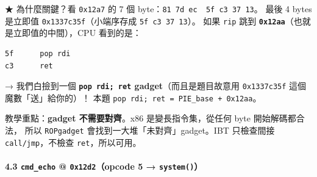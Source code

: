 \documentclass[10pt,a4paper]{article}
\renewenvironment{quote}{%
  \begin{mdframed}[linewidth=0pt,innerleftmargin=0pt,innerrightmargin=0pt,
    innerbottommargin=0pt,innertopmargin=0pt,skipabove=0.55em,skipbelow=0.55em,
    leftmargin=0.9em,rightmargin=0.4em,startcode={\color{quotebar}\vrule width 2.6pt},%
    endcode={}]%
  \itshape\color{black}%
}{%
  \end{mdframed}%
}
\begin{document}
★ 為什麼關鍵？看 \texttt{0x12a7} 的 7 個
byte：\texttt{81\ \allowbreak{}7d\ \allowbreak{}ec\ \allowbreak{}\textbar{}\allowbreak{}\ \allowbreak{}5f\ \allowbreak{}c3\ \allowbreak{}37\ \allowbreak{}13}。 最後 4 bytes
是立即值 \texttt{0x1337c35f}（小端序存成 \texttt{5f\ \allowbreak{}c3\ \allowbreak{}37\ \allowbreak{}13}）。
如果 \texttt{rip} 跳到
\textbf{\texttt{0x12aa}}（也就是立即值的中間），CPU 看到的是：

\begin{Verbatim}[breaklines=true,breakanywhere=true,breakautoindent=false,fontsize=\fontsize{7.0}{9.5}\selectfont]
5f      pop rdi
c3      ret
\end{Verbatim}

→ 我們白撿到一個 \textbf{\texttt{pop\ \allowbreak{}rdi;\ \allowbreak{}ret}
gadget}（而且是題目故意用 \texttt{0x1337c35f} 這個魔數「送」給你的）！
本題 \texttt{pop\ \allowbreak{}rdi;\ \allowbreak{}ret\ \allowbreak{}=\ \allowbreak{}PIE\_\allowbreak{}base\ \allowbreak{}+\ \allowbreak{}0x12aa}。

\begin{quote}
教學重點：\textbf{gadget 不需要對齊}。x86 是變長指令集，從任何 byte
開始解碼都合法， 所以 \texttt{ROPgadget}
會找到一大堆「未對齊」gadget。IBT 只檢查間接 \texttt{call/\allowbreak{}jmp}，不檢查
\texttt{ret}，所以可用。
\end{quote}

\paragraph{\texorpdfstring{4.3 \texttt{cmd\_\allowbreak{}echo} @
\texttt{0x12d2}（opcode 5 →
\texttt{system()}）}{4.3 cmd\_echo @ 0x12d2（opcode 5 → system()）}}\label{cmd_echo-0x12d2opcode-5-system}
\end{document}

